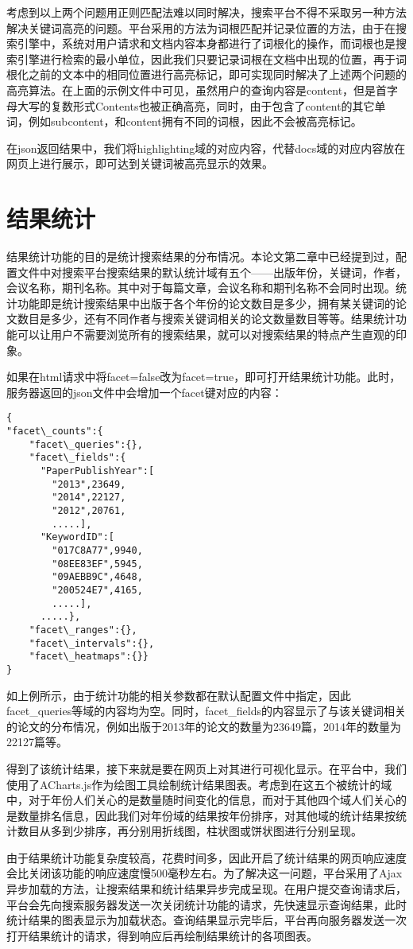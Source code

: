 考虑到以上两个问题用正则匹配法难以同时解决，搜索平台不得不采取另一种方法解决关键词高亮的问题。平台采用的方法为词根匹配并记录位置的方法，由于在搜索引擎中，系统对用户请求和文档内容本身都进行了词根化的操作，而词根也是搜索引擎进行检索的最小单位，因此我们只要记录词根在文档中出现的位置，再于词根化之前的文本中的相同位置进行高亮标记，即可实现同时解决了上述两个问题的高亮算法。在上面的示例文件中可见，虽然用户的查询内容是content，但是首字母大写的复数形式Contents也被正确高亮，同时，由于包含了content的其它单词，例如subcontent，和content拥有不同的词根，因此不会被高亮标记。

在json返回结果中，我们将highlighting域的对应内容，代替docs域的对应内容放在网页上进行展示，即可达到关键词被高亮显示的效果。

\section{结果统计}
结果统计功能的目的是统计搜索结果的分布情况。本论文第二章中已经提到过，配置文件中对搜索平台搜索结果的默认统计域有五个——出版年份，关键词，作者，会议名称，期刊名称。其中对于每篇文章，会议名称和期刊名称不会同时出现。统计功能即是统计搜索结果中出版于各个年份的论文数目是多少，拥有某关键词的论文数目是多少，还有不同作者与搜索关键词相关的论文数量数目等等。结果统计功能可以让用户不需要浏览所有的搜索结果，就可以对搜索结果的特点产生直观的印象。

如果在html请求中将facet=false改为facet=true，即可打开结果统计功能。此时，服务器返回的json文件中会增加一个facet键对应的内容：

\begin{lstlisting}[caption={结果统计}, label=facet, escapeinside="", numbers=none]
{
"facet\_counts":{
    "facet\_queries":{},
    "facet\_fields":{
      "PaperPublishYear":[
        "2013",23649,
        "2014",22127,
        "2012",20761,
        .....],
      "KeywordID":[
        "017C8A77",9940,
        "08EE83EF",5945,
        "09AEBB9C",4648,
        "200524E7",4165,
        .....],
      .....},
    "facet\_ranges":{},
    "facet\_intervals":{},
    "facet\_heatmaps":{}}
}
\end{lstlisting}

如上例所示，由于统计功能的相关参数都在默认配置文件中指定，因此facet\_queries等域的内容均为空。同时，facet\_fields的内容显示了与该关键词相关的论文的分布情况，例如出版于2013年的论文的数量为23649篇，2014年的数量为22127篇等。

得到了该统计结果，接下来就是要在网页上对其进行可视化显示。在平台中，我们使用了ACharts.js作为绘图工具绘制统计结果图表。考虑到在这五个被统计的域中，对于年份人们关心的是数量随时间变化的信息，而对于其他四个域人们关心的是数量排名信息，因此我们对年份域的结果按年份排序，对其他域的统计结果按统计数目从多到少排序，再分别用折线图，柱状图或饼状图进行分别呈现。

由于结果统计功能复杂度较高，花费时间多，因此开启了统计结果的网页响应速度会比关闭该功能的响应速度慢500毫秒左右。为了解决这一问题，平台采用了Ajax异步加载的方法，让搜索结果和统计结果异步完成呈现。在用户提交查询请求后，平台会先向搜索服务器发送一次关闭统计功能的请求，先快速显示查询结果，此时统计结果的图表显示为加载状态。查询结果显示完毕后，平台再向服务器发送一次打开结果统计的请求，得到响应后再绘制结果统计的各项图表。
